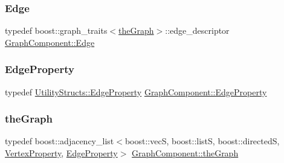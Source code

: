 \subsubsection{\texorpdfstring{Edge}{Edge}}
{\footnotesize\ttfamily typedef boost\+::graph\+\_\+traits$<$\hyperlink{class_graph_component_a982e0748a6e1b8dc74986f5f8b3dca5c_a982e0748a6e1b8dc74986f5f8b3dca5c}{the\+Graph}$>$\+::edge\+\_\+descriptor \hyperlink{class_graph_component_aa7517b2af08aa717324076a645c73fe6_aa7517b2af08aa717324076a645c73fe6}{Graph\+Component\+::\+Edge}}

\mbox{\label{class_graph_component_ae2f6ef4a3ac656d8213df42aa3d4c3b3_ae2f6ef4a3ac656d8213df42aa3d4c3b3}} 
\subsubsection{\texorpdfstring{Edge\+Property}{EdgeProperty}}
{\footnotesize\ttfamily typedef \hyperlink{struct_utility_structs_1_1_edge_property}{Utility\+Structs\+::\+Edge\+Property} \hyperlink{class_graph_component_ae2f6ef4a3ac656d8213df42aa3d4c3b3_ae2f6ef4a3ac656d8213df42aa3d4c3b3}{Graph\+Component\+::\+Edge\+Property}}

\mbox{\label{class_graph_component_a982e0748a6e1b8dc74986f5f8b3dca5c_a982e0748a6e1b8dc74986f5f8b3dca5c}} 
\subsubsection{\texorpdfstring{the\+Graph}{theGraph}}
{\footnotesize\ttfamily typedef boost\+::adjacency\+\_\+list$<$boost\+::vecS, boost\+::listS, boost\+::directedS, \hyperlink{class_graph_component_a7c0fcb3f03bf188b7df520e0cdd364b7_a7c0fcb3f03bf188b7df520e0cdd364b7}{Vertex\+Property}, \hyperlink{class_graph_component_ae2f6ef4a3ac656d8213df42aa3d4c3b3_ae2f6ef4a3ac656d8213df42aa3d4c3b3}{Edge\+Property}$>$ \hyperlink{class_graph_component_a982e0748a6e1b8dc74986f5f8b3dca5c_a982e0748a6e1b8dc74986f5f8b3dca5c}{Graph\+Component\+::the\+Graph}}

\mbox{\label{class_graph_component_ad40772702161324303e24463a63738e9_ad40772702161324303e24463a63738e9}} 
